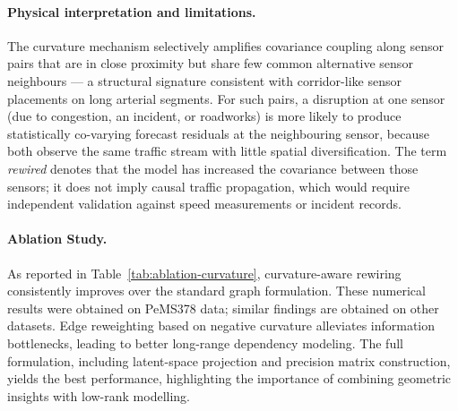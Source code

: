 \documentclass{article}
\theoremstyle{plain}
\theoremstyle{definition}
\theoremstyle{remark}
\begin{document}
\paragraph{Physical interpretation and limitations.}\label{limitation}
The curvature mechanism selectively amplifies covariance coupling along sensor
pairs that are in close proximity but share few common alternative sensor
neighbours — a structural signature consistent with corridor-like sensor placements
on long arterial segments. For such pairs, a disruption at one sensor (due to
congestion, an incident, or roadworks) is more likely to produce statistically
co-varying forecast residuals at the neighbouring sensor, because both observe the
same traffic stream with little spatial diversification. The term \textit{rewired} denotes
that the model has increased the covariance between those sensors; it does
not imply causal traffic propagation, which would require independent validation
against speed measurements or incident records.



\paragraph{Ablation Study.}
\label{sec:ablation}

\begin{table}[t]
\centering
\caption{Ablation study on curvature-aware spatial correlation variants.}
\label{tab:ablation-curvature}
\end{table}

As reported in Table~\ref{tab:ablation-curvature}, curvature-aware rewiring consistently improves over the standard graph
formulation. These numerical results were obtained on PeMS378 data; similar findings are obtained on other datasets.
Edge reweighting based on negative curvature alleviates
information bottlenecks, leading to better long-range dependency modeling.
The full formulation, including latent-space projection and precision matrix
construction, yields the best performance, highlighting the importance of
combining geometric insights with low-rank modelling.
\end{document}
